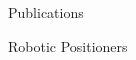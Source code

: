 \documentclass{resume} %
\begin{document}
\begin{rSection}{Publications}
\begin{rSubsection}{Robotic Positioners}{}{}{}
\begin{enumerate}
        \end{enumerate}
            
    \end{rSubsection}        


    
\end{rSection}
\end{document}
